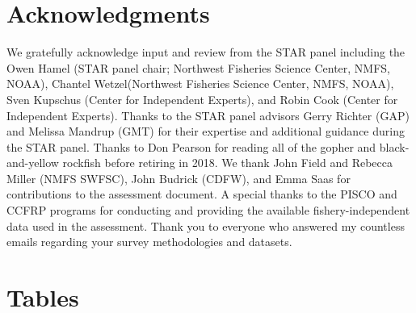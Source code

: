 \documentclass[12pt,]{article}
\begin{document}
\section{Acknowledgments}\label{acknowledgments}

We gratefully acknowledge input and review from the STAR panel including
the Owen Hamel (STAR panel chair; Northwest Fisheries Science Center,
NMFS, NOAA), Chantel Wetzel(Northwest Fisheries Science Center, NMFS,
NOAA), Sven Kupschus (Center for Independent Experts), and Robin Cook
(Center for Independent Experts). Thanks to the STAR panel advisors
Gerry Richter (GAP) and Melissa Mandrup (GMT) for their expertise and
additional guidance during the STAR panel. Thanks to Don Pearson for
reading all of the gopher and black-and-yellow rockfish before retiring
in 2018. We thank John Field and Rebecca Miller (NMFS SWFSC), John
Budrick (CDFW), and Emma Saas for contributions to the assessment
document. A special thanks to the PISCO and CCFRP programs for
conducting and providing the available fishery-independent data used in
the assessment. Thank you to everyone who answered my countless emails
regarding your survey methodologies and datasets.

\newpage

\FloatBarrier

\section{Tables}\label{tables}

\FloatBarrier
\end{document}
